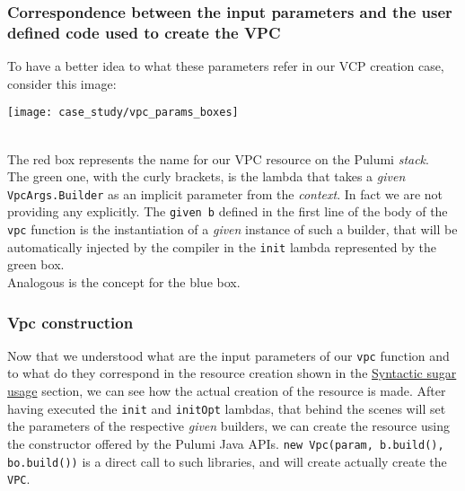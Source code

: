 \subsubsection{Correspondence between the input parameters and the user defined code used to create the VPC}
To have a better idea to what these parameters refer in our VCP creation case, consider this image:
\begin{center}
  \texttt{[image: case\_study/vpc\_params\_boxes]} 
\end{center}\mbox{}\\
The red box represents the name for our VPC resource on the Pulumi \textit{stack}.\\
The green one, with the curly brackets, is the lambda that takes a \textit{given} \texttt{VpcArgs.Builder} as an implicit parameter from the \textit{context}.
In fact we are not providing any explicitly.
The \texttt{given b} defined in the first line of the body of the \texttt{vpc} function is the instantiation of a \textit{given} instance of such a builder, that will be automatically injected by the compiler in the \texttt{init} lambda represented by the green box.\\
Analogous is the concept for the blue box.\\

\subsubsection{Vpc construction}
Now that we understood what are the input parameters of our \texttt{vpc} function and to what do they correspond in the resource creation shown in the \hyperref[ssec:syn-sug-usage]{Syntactic sugar usage} section, we can see how the actual creation of the resource is made.
After having executed the \texttt{init} and \texttt{initOpt} lambdas, that behind the scenes will set the parameters of the respective \textit{given} builders, we can create the resource using the constructor offered by the Pulumi Java APIs.
\texttt{new Vpc(param, b.build(), bo.build())} is a direct call to such libraries, and will create actually create the \texttt{VPC}.

